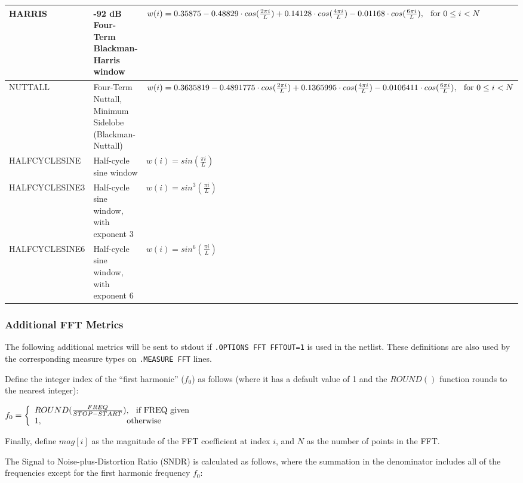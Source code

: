 \begin{longtable}[h] {>{\raggedright\small}m{1.15in}|>{\raggedright\let\\\tabularnewline\small}m{1.35in}
  |>{\raggedright\let\\\tabularnewline\small}m{3.5in}}
  HARRIS & -92 dB Four-Term Blackman-Harris window~\cite{Doerry2017} &
    $w(i) = 0.35875 - 0.48829 \cdot cos(\frac{2 \pi i}{L}) + 0.14128 \cdot cos(\frac{4 \pi i}{L}) - 0.01168 \cdot cos(\frac{6 \pi i}{L}), \hspace*{0.1in}\textrm{for}~0 \leq i < N$  \\ \hline
  NUTTALL & Four-Term Nuttall, Minimum Sidelobe (Blackman-Nuttall)~\cite{Doerry2017} &
    $w(i) = 0.3635819 - 0.4891775 \cdot cos(\frac{2 \pi i}{L}) + 0.1365995 \cdot cos(\frac{4 \pi i}{L}) - 0.0106411 \cdot cos(\frac{6 \pi i}{L}), \hspace*{0.1in}\textrm{for}~0 \leq i < N$  \\ \hline
   HALFCYCLESINE & Half-cycle sine window & $w(i) = sin(\frac{\pi i}{L}) $ \\ \hline
   HALFCYCLESINE3 & Half-cycle sine window, with exponent 3 & $w(i) = sin^{3}(\frac{\pi i}{L}) $ \\ \hline
   HALFCYCLESINE6 & Half-cycle sine window, with exponent 6 & $w(i) = sin^{6}(\frac{\pi i}{L}) $ \\ \hline
\end{longtable}

\subsubsection{Additional FFT Metrics}
\label{FFT_metrics}
The following additional metrics will be sent to stdout if \texttt{.OPTIONS FFT FFTOUT=1}
is used in the netlist.  These definitions are also used by the corresponding measure
types on \texttt{.MEASURE FFT} lines.

Define the integer index of the ``first harmonic'' ($f_{0}$) as follows (where it has a
default value of 1 and the $ROUND()$ function rounds to the nearest integer):

$f_{0}=\left\{\begin{array}{ll}ROUND(\frac{FREQ}{STOP-START}),\hspace*{0.1in}\textrm{if FREQ given} \\
 1,\hspace*{1.4in}\textrm{otherwise}\end{array}\right.$

Finally, define $mag[i]$ as the magnitude of the FFT coefficient at index $i$, and $N$ as
the number of points in the FFT.

The Signal to Noise-plus-Distortion Ratio (SNDR) is calculated as follows, where the summation
in the denominator includes all of the frequencies except for the first harmonic frequency $f_{0}$:

